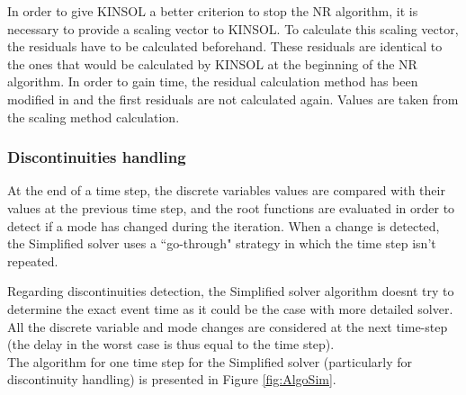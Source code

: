 \documentclass[a4paper, 12pt]{report}
\begin{document}
In order to give \ac{KINSOL} a better criterion to stop the \ac{NR} algorithm, it is necessary to provide a scaling vector to \ac{KINSOL}. To calculate this scaling vector, the residuals have to be calculated beforehand. These residuals are identical to the ones that would be calculated by \ac{KINSOL} at the beginning of the \ac{NR} algorithm. In order to gain time, the residual calculation method has been modified in \Dynawo  and the first residuals are not calculated again. Values are taken from the scaling method calculation.

\subsubsection{Discontinuities handling}

At the end of a time step, the discrete variables values are compared with their values at the previous time step, and the root functions are evaluated in order to detect if a mode has changed during the iteration. When a change is detected, the Simplified solver uses a ``go-through" strategy in which the time step isn't repeated.

Regarding discontinuities detection, the Simplified solver algorithm doesn\textquotesingle t try to determine the exact event time as it could be the case with more detailed solver. All the discrete variable and mode changes are considered at the next  time-step (the delay in the worst case is thus equal to the time step). \\

The algorithm for one time step for the Simplified solver (particularly for discontinuity handling) is presented in Figure \ref{fig:AlgoSim}.
\end{document}
